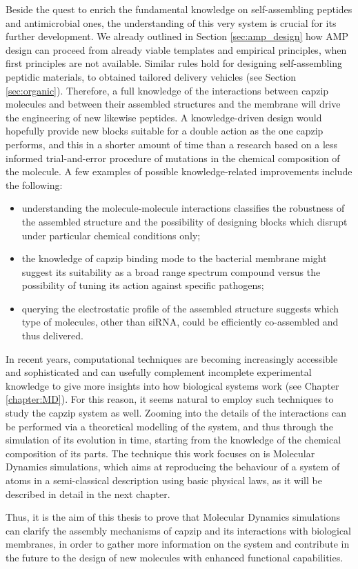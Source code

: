Beside the quest to enrich the fundamental knowledge on self-assembling peptides and antimicrobial ones, the understanding of this very system is crucial for its further development. We already outlined in Section \ref{sec:amp_design} how AMP design can proceed from already viable templates and empirical principles, when first principles are not available. Similar rules hold for designing self-assembling peptidic materials, to obtained tailored delivery vehicles (see Section \ref{sec:organic}).
%
Therefore, a full knowledge of the interactions between capzip molecules and between their assembled structures and the membrane will drive the engineering of new likewise peptides. A knowledge-driven design would hopefully provide new blocks suitable for a double action as the one capzip performs, and this in a shorter amount of time than a research based on a less informed trial-and-error procedure of mutations in the chemical composition of the molecule. A few examples of possible knowledge-related improvements include the following:
\begin{itemize}
\item understanding the molecule-molecule interactions classifies the robustness of the assembled structure and the possibility of designing blocks which disrupt under particular chemical conditions only;
\item the knowledge of capzip binding mode to the bacterial membrane might suggest its suitability as a broad range spectrum compound versus the possibility of tuning its action against specific pathogens;
\item querying the electrostatic profile of the assembled structure suggests which type of molecules, other than siRNA, could be efficiently co-assembled and thus delivered.
\end{itemize}

In recent years, computational techniques are becoming increasingly accessible and sophisticated and can usefully complement incomplete experimental knowledge to give more insights into how biological systems work (see Chapter \ref{chapter:MD}). For this reason, it seems natural to employ such techniques to study the capzip system as well. Zooming into the details of the interactions can be performed via a theoretical modelling of the system, and thus through the simulation of its evolution in time, starting from the knowledge of the chemical composition of its parts. The technique this work focuses on is Molecular Dynamics simulations, which aims at reproducing the behaviour of a system of atoms in a semi-classical description using basic physical laws, as it will be described in detail in the next chapter.

Thus, it is the aim of this thesis to prove that Molecular Dynamics simulations can clarify the assembly mechanisms of capzip and its interactions with biological membranes, in order to gather more information on the system and contribute in the future to the design of new molecules with enhanced functional capabilities.
